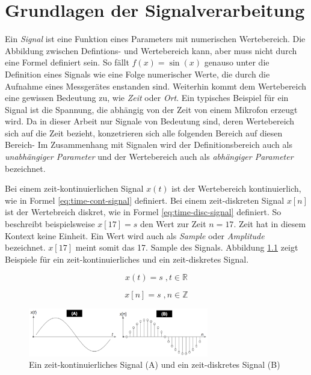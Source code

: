 \chapter{Grundlagen der Signalverarbeitung}

Ein \emph{Signal} ist eine Funktion eines Parameters mit numerischen Wertebereich. Die Abbildung zwischen Defintions- und Wertebereich kann, aber muss nicht durch eine Formel definiert sein. So fällt $f(x) = \sin( x )$ genauso unter die Definition eines Signals wie eine Folge numerischer Werte, die durch die Aufnahme eines Messgerätes enstanden sind. Weiterhin kommt dem Wertebereich eine gewissen Bedeutung zu, wie \emph{Zeit} oder \emph{Ort}. Ein typisches Beispiel für ein Signal ist die Spannung, die abhängig von der Zeit von einem Mikrofon erzeugt wird.  Da in dieser Arbeit nur Signale von Bedeutung sind, deren Wertebereich sich auf die Zeit bezieht, konzetrieren sich alle folgenden Bereich auf diesen Bereich- Im Zusammenhang mit Signalen wird der Definitionsbereich auch als \emph{unabhängiger Parameter} und der Wertebereich auch als \emph{abhängiger Parameter} bezeichnet. \cite[S. 11-12]{dspGuide} \cite[S. 22-23]{dspMichigan}

 Bei einem zeit-kontinuierlichen Signal $x( t )$ ist der Wertebereich kontinuierlich, wie in Formel  \ref{eq:time-cont-signal} definiert. Bei einem zeit-diskreten Signal $x[n]$ ist der Wertebreich diskret, wie in Formel \ref{eq:time-disc-signal} definiert. So beschreibt beispielsweise $x[17] = s$ den Wert zur Zeit $n = 17$. \glqq Zeit\grqq{} hat in diesem Kontext keine Einheit. Ein Wert wird auch als \emph{Sample} oder \emph{Amplitude} bezeichnet. $x[17] $ meint somit das 17. Sample des Signals. Abbildung \ref{img:aSignal} zeigt Beispiele für ein zeit-kontinuierliches und ein zeit-diskretes Signal. \cite[S. 22 - 23]{dspMichigan}

 \begin{equation}
x(t) = s \; , t \in \mathbb{R}
\label{eq:time-cont-signal}
\end{equation}


\begin{equation}
x[n] = s \; , n \in \mathbb{Z} 
\label{eq:time-disc-signal}
\end{equation}

\begin{figure}
	\centering
	\includegraphics[width=0.7\textwidth]{bilder/aSignal02.png}
	\caption{Ein zeit-kontinuierliches Signal (A) und ein zeit-diskretes Signal (B)}
	\label{img:aSignal}
\end{figure}

